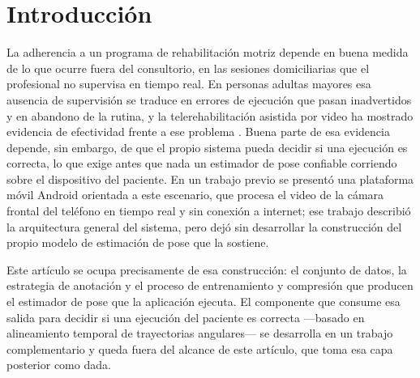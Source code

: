 \documentclass[10pt,a4paper,twocolumn]{article}
\begin{document}
\section{Introducción}

La adherencia a un programa de rehabilitación motriz depende en buena medida
de lo que ocurre fuera del consultorio, en las sesiones domiciliarias que el
profesional no supervisa en tiempo real. En personas adultas mayores esa
ausencia de supervisión se traduce en errores de ejecución que pasan
inadvertidos y en abandono de la rutina, y la telerehabilitación asistida por
video ha mostrado evidencia de efectividad frente a ese problema
\cite{jirasakulsuk2022}. Buena parte de esa evidencia depende, sin embargo,
de que el propio sistema pueda decidir si una ejecución es correcta, lo que
exige antes que nada un estimador de pose confiable corriendo sobre el
dispositivo del paciente. En un trabajo previo \cite{anonimo_previo} se
presentó una plataforma móvil Android orientada a este escenario, que procesa
el video de la cámara frontal del teléfono en tiempo real y sin conexión a
internet; ese trabajo describió la arquitectura general del sistema, pero
dejó sin desarrollar la construcción del propio modelo de estimación de pose
que la sostiene.

Este artículo se ocupa precisamente de esa construcción: el conjunto de
datos, la estrategia de anotación y el proceso de entrenamiento y compresión
que producen el estimador de pose que la aplicación ejecuta. El componente
que consume esa salida para decidir si una ejecución del paciente es
correcta ---basado en alineamiento temporal de trayectorias angulares--- se
desarrolla en un trabajo complementario \cite{anonimo_dtw} y queda fuera del
alcance de este artículo, que toma esa capa posterior como dada.
\end{document}
